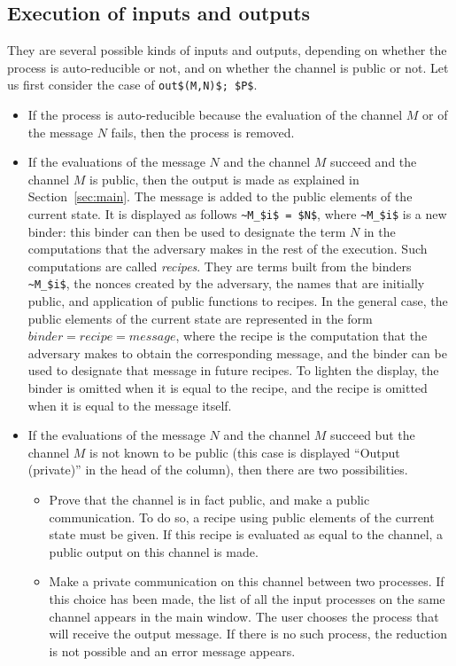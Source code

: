 \documentclass{book}
\begin{document}
\subsection{Execution of inputs and outputs}\label{sec:input_output_simulation}
They are several possible kinds of inputs and outputs, depending on whether the process is auto-reducible or not, and on whether the channel is public or not.
Let us first consider the case of \lstinline!out$(M,N)$; $P$!.
\begin{itemize}
\item If the process is auto-reducible because the evaluation of the channel $M$ or of the message $N$ fails, then the process is removed.

\item If the evaluations of the message $N$ and the channel $M$ succeed and the channel $M$ is public, then the output is made as explained in Section~\ref{sec:main}. The message is added to the public elements of the current state. It is displayed as follows \lstinline!~M_$i$ = $N$!, where \lstinline!~M_$i$! is a new binder: this binder can then be used to designate the term $N$ in the computations that the adversary makes in the rest of the execution. Such computations are called \emph{recipes}. They are terms built from the binders \lstinline!~M_$i$!, the nonces created by the adversary, the names that are initially public, and application of public functions to recipes. In the general case, the public elements of the current state are represented in the form $\mathit{binder} = \mathit{recipe} = \mathit{message}$, where the recipe is the computation that the adversary makes to obtain the corresponding message, and the binder can be used to designate that message in future recipes. To lighten the display, the binder is omitted when it is equal to the recipe, and the recipe is omitted when it is equal to the message itself.

\item If the evaluations of the message $N$ and the channel $M$ succeed but the channel $M$ is not known to be public (this case is displayed ``Output (private)'' in the head of the column), then there are two possibilities.
\begin{itemize}
\item Prove that the channel is in fact public, and make a public communication. To do so, a recipe using public elements of the current state must be given. If this recipe is evaluated as equal to the channel, a public output on this channel is made.
\item Make a private communication on this channel between two processes. If this choice has been made, the list of all the input processes on the same channel appears in the main window. The user chooses the process that will receive the output message. If there is no such process, the reduction is not possible and an error message appears.
\end{itemize}
\end{itemize}
\end{document}
